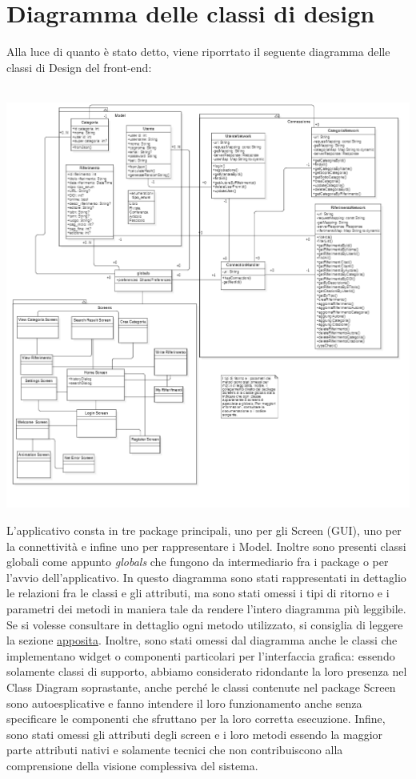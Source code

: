 {\raggedright{\section{Diagramma delle classi di design}}
Alla luce di quanto è stato detto, viene riporrtato il seguente diagramma delle classi di Design del front-end: 
\\~\\
        \begin{center}
            \includegraphics[width=.95\textwidth]{Immagini/Alexandria/UML Design.PNG} 
        \end{center}
L'applicativo consta in tre package principali, uno per gli Screen (GUI), uno per la connettività e infine uno per rappresentare i Model. Inoltre sono presenti classi globali come appunto \textit{globals} che fungono da intermediario fra i package o per l'avvio dell'applicativo. In questo diagramma sono stati rappresentati in dettaglio le relazioni fra le classi e gli attributi, ma sono stati omessi i tipi di ritorno e i parametri dei metodi in maniera tale da rendere l'intero diagramma più leggibile. Se si volesse consultare in dettaglio ogni metodo utilizzato, si consiglia di leggere la sezione \hyperref[sourceCode]{apposita}. Inoltre, sono stati omessi dal diagramma anche le classi che implementano widget o componenti particolari per l'interfaccia grafica: essendo solamente classi di supporto, abbiamo considerato ridondante la loro presenza nel Class Diagram soprastante, anche perché le classi contenute nel package Screen sono autoesplicative e fanno intendere il loro funzionamento anche senza specificare le componenti che sfruttano per la loro corretta esecuzione. Infine, sono stati omessi gli attributi degli screen e i loro metodi essendo la maggior parte attributi nativi e solamente tecnici che non contribuiscono alla comprensione della visione complessiva del sistema.


}
